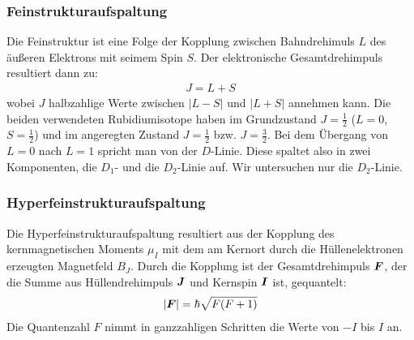 \documentclass[12pt]{article}
\renewcommand*\vec[1]{{\mbox{\boldmath\ensuremath{#1}}}}
\begin{document}
\subsubsection{Feinstrukturaufspaltung}
Die Feinstruktur ist eine Folge der Kopplung zwischen Bahndrehimuls $L$ des äußeren Elektrons mit seimem Spin $S$.
Der elektronische Gesamtdrehimpuls resultiert dann zu:
\begin{align}
 J = L + S
\end{align}
wobei $J$ halbzahlige Werte zwischen $|L-S|$ und $|L+S|$ annehmen kann.
Die beiden verwendeten Rubidiumisotope haben im Grundzustand $J = \frac{1}{2}$ ($L = 0$, $S = \frac{1}{2}$) und im angeregten Zustand $J = \frac{1}{2}$ bzw. $J = \frac{3}{2}$. Bei dem Übergang von $L = 0$ nach $L = 1$ spricht man von der $D$-Linie. Diese spaltet also in zwei Komponenten, die $D_1$- und die $D_2$-Linie auf. Wir untersuchen nur die $D_2$-Linie.

\subsubsection{Hyperfeinstrukturaufspaltung}
Die Hyperfeinstrukturaufspaltung resultiert aus der Kopplung des kernmagnetischen Moments $\mu_I$ mit dem am Kernort durch die Hüllenelektronen erzeugten Magnetfeld $B_J$.
Durch die Kopplung ist der Gesamtdrehimpuls $\vec{F}$, der die Summe aus Hüllendrehimpuls $\vec{J}$ und Kernspin $\vec{I}$ ist, gequantelt:
\begin{align*}
 \left|\vec{F}\right| = \hbar \sqrt{F(F+1)}
\end{align*}
Die Quantenzahl $F$ nimmt in ganzzahligen Schritten die Werte von $-I$ bis $I$ an.
\end{document}
